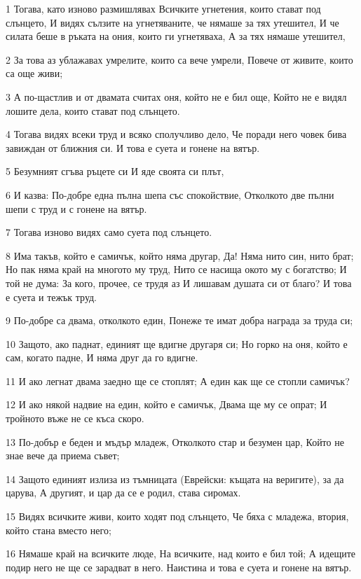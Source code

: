 \par 1 Тогава, като изново размишлявах Всичките угнетения, които стават под слънцето, И видях сълзите на угнетяваните, че нямаше за тях утешител, И че силата беше в ръката на ония, които ги угнетяваха, А за тях нямаше утешител,
\par 2 За това аз ублажавах умрелите, които са вече умрели, Повече от живите, които са още живи;
\par 3 А по-щастлив и от двамата считах оня, който не е бил още, Който не е видял лошите дела, които стават под слънцето.
\par 4 Тогава видях всеки труд и всяко сполучливо дело, Че поради него човек бива завиждан от ближния си. И това е суета и гонене на вятър.
\par 5 Безумният сгъва ръцете си И яде своята си плът,
\par 6 И казва: По-добре една пълна шепа със спокойствие, Отколкото две пълни шепи с труд и с гонене на вятър.
\par 7 Тогава изново видях само суета под слънцето.
\par 8 Има такъв, който е самичък, който няма другар, Да! Няма нито син, нито брат; Но пак няма край на многото му труд, Нито се насища окото му с богатство; И той не дума: За кого, прочее, се трудя аз И лишавам душата си от благо? И това е суета и тежък труд.
\par 9 По-добре са двама, отколкото един, Понеже те имат добра награда за труда си;
\par 10 Защото, ако паднат, единият ще вдигне другаря си; Но горко на оня, който е сам, когато падне, И няма друг да го вдигне.
\par 11 И ако легнат двама заедно ще се стоплят; А един как ще се стопли самичък?
\par 12 И ако някой надвие на един, който е самичък, Двама ще му се опрат; И тройното въже не се къса скоро.
\par 13 По-добър е беден и мъдър младеж, Отколкото стар и безумен цар, Който не знае вече да приема съвет;
\par 14 Защото единият излиза из тъмницата (Еврейски: къщата на веригите), за да царува, А другият, и цар да се е родил, става сиромах.
\par 15 Видях всичките живи, които ходят под слънцето, Че бяха с младежа, втория, който стана вместо него;
\par 16 Нямаше край на всичките люде, На всичките, над които е бил той; А идещите подир него не ще се зарадват в него. Наистина и това е  суета и гонене на вятър.

